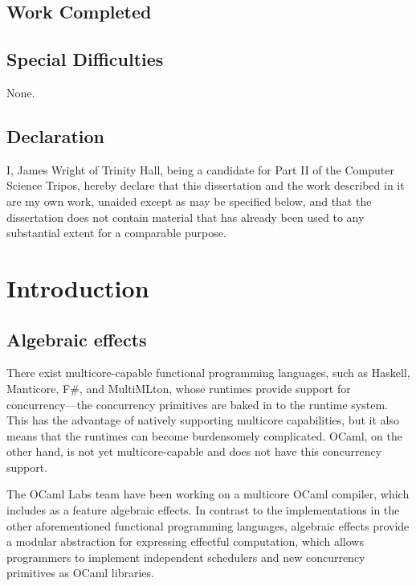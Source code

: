 \documentclass[12pt,a4paper,twoside,openright]{report}
\begin{document}
\section*{Work Completed}

\section*{Special Difficulties}

None.
 
\newpage
\section*{Declaration}

I, James Wright of Trinity Hall, being a candidate for Part II of the Computer
Science Tripos, hereby declare
that this dissertation and the work described in it are my own work,
unaided except as may be specified below, and that the dissertation
does not contain material that has already been used to any substantial
extent for a comparable purpose.

\bigskip
{}

\medskip
{}

\tableofcontents

\listoffigures


\pagestyle{headings}

\chapter{Introduction}

\section{Algebraic effects}

There exist multicore-capable functional programming languages, such as Haskell, Manticore, F\#, and MultiMLton, whose runtimes provide support for concurrency---the concurrency primitives are baked in to the runtime system. This has the advantage of natively supporting multicore capabilities, but it also means that the runtimes can become burdensomely complicated. OCaml, on the other hand, is not yet multicore-capable and does not have this concurrency support.

The OCaml Labs team have been working on a multicore OCaml compiler, which includes as a feature algebraic effects. In contrast to the implementations in the other aforementioned functional programming languages, algebraic effects provide a modular abstraction for expressing effectful computation, which allows programmers to implement independent schedulers and new concurrency primitives as OCaml libraries.
\end{document}

